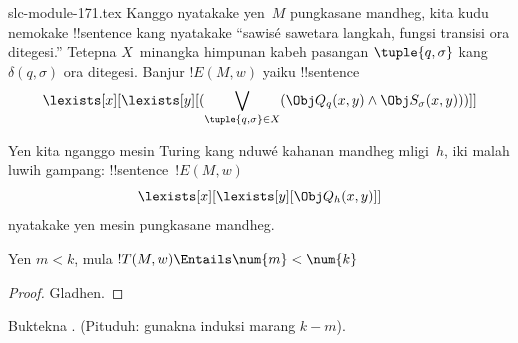 \begin{filecontents*}[overwrite]{slc-module-171.tex}
Kanggo nyatakake yen~$M$ pungkasane mandheg,
kita kudu nemokake !!{sentence} kang nyatakake
``sawisé sawetara langkah, fungsi transisi
ora ditegesi.'' Tetepna $X$~minangka himpunan
kabeh pasangan $\tuple{q, \sigma}$ kang
$\delta(q, \sigma)$ ora ditegesi.
Banjur $!E(M, w)$ yaiku !!{sentence}
\[
\lexists[x][\lexists[y][(\bigvee_{\tuple{q, \sigma} \in
      X}(\Obj Q_q(x, y) \land \Obj S_\sigma(x, y)))]]
\]

Yen kita nganggo mesin Turing kang nduwé
kahanan mandheg mligi~$h$, iki malah luwih
gampang: !!{sentence}~$!E(M, w)$
\[
\lexists[x][\lexists[y][\Obj Q_h(x, y)]]
\]
nyatakake yen mesin pungkasane mandheg.

\begin{prop}
Yen $m < k$, mula $!T(M, w) \Entails \num{m} < \num{k}$
\end{prop}

\begin{proof}
Gladhen.
\end{proof}

\begin{prob}
Buktekna .
(Pituduh: gunakna induksi marang $k-m$).
\end{prob}


\end{filecontents*}

